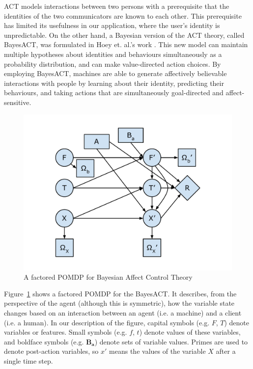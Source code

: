ACT models interactions between two persons with a prerequisite that the identities of the two communicators are known to each other. This prerequisite has limited its usefulness in our application, where the user's identity is unpredictable. On the other hand, a Bayesian version of the ACT theory, called BayesACT, was formulated in Hoey et. al.'s work \cite{hoey2013bayesian}. This new model can maintain multiple hypotheses about identities and behaviours simultaneously as a probability distribution, and can make value-directed action choices. By employing BayesACT, machines are able to generate affectively believable interactions with people by learning about their identity, predicting their behaviours, and taking actions that are simultaneously goal-directed and affect-sensitive.

\begin{figure}[htb]
\centering
\includegraphics[width=0.9\linewidth]{fig-bayesact.pdf}
\caption{A factored POMDP for Bayesian Affect Control Theory}
\label{fig:bayesact}
\end{figure}

Figure~\ref{fig:bayesact} shows a factored POMDP for the BayesACT. It describes, from the perspective of the agent (although this is symmetric), how the variable state changes based on an interaction between an agent (i.e. a machine) and a client (i.e. a human). In our description of the figure, capital symbols (e.g. $F$, $T$) denote variables or features. Small symbols (e.g. $f$, $t$) denote values of these variables, and boldface symbols (e.g. $\mathbf{B_{a}}$) denote sets of variable values. Primes are used to denote post-action variables, so $x'$ means the values of the variable $X$ after a single time step.

